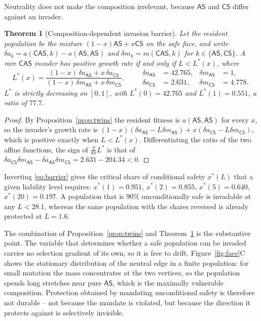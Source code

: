 \documentclass[pdflatex]{sn-jnl}
\theoremstyle{thmstyleone}
\newtheorem{theorem}{Theorem}
\theoremstyle{thmstylethree}
\theoremstyle{thmstyletwo}
\newcommand{\AS}{\textsf{AS}}
\newcommand{\CS}{\textsf{CS}}
\newcommand{\CAS}{\textsf{CAS}}
\begin{document}
Neutrality does not make the composition irrelevant, because $\AS$ and $\CS$
differ against an invader.

\begin{theorem}[Composition-dependent invasion barrier]\label{thm:barrier}
Let the resident population be the mixture $(1-x)\AS+x\CS$ on the safe face,
and write
$\delta a_{k}=a(\CAS,k)-a(\AS,\AS)$ and $\delta m_{k}=m(\CAS,k)$ for
$k\in\{\AS,\CS\}$. A rare $\CAS$ invader has positive growth rate if and only
if $L<L^{*}(x)$, where
\begin{equation}
L^{*}(x)=\frac{(1-x)\,\delta a_{\AS}+x\,\delta a_{\CS}}
               {(1-x)\,\delta m_{\AS}+x\,\delta m_{\CS}},
\qquad
\begin{aligned}
\delta a_{\AS}&=42.765, &\delta m_{\AS}&=1,\\
\delta a_{\CS}&=2.631, &\delta m_{\CS}&=4.778 .
\end{aligned}
\label{eq:barrier}
\end{equation}
$L^{*}$ is strictly decreasing on $[0,1]$, with $L^{*}(0)=42.765$ and
$L^{*}(1)=0.551$, a ratio of $77.7$.
\end{theorem}

\begin{proof}
By Proposition~\ref{prop:twins} the resident fitness is $a(\AS,\AS)$ for every
$x$, so the invader's growth rate is
$(1-x)(\delta a_{\AS}-L\delta m_{\AS})+x(\delta a_{\CS}-L\delta m_{\CS})$,
which is positive exactly when $L<L^{*}(x)$. Differentiating the ratio of the
two affine functions, the sign of $\frac{d}{dx}L^{*}$ is that of
$\delta a_{\CS}\delta m_{\AS}-\delta a_{\AS}\delta m_{\CS}=2.631-204.34<0$.
\end{proof}

Inverting \eqref{eq:barrier} gives the critical share of conditional safety
$x^{*}(L)$ that a given liability level requires: $x^{*}(1)=0.951$,
$x^{*}(2)=0.855$, $x^{*}(5)=0.640$, $x^{*}(20)=0.197$. A population that is
$90\%$ unconditionally safe is invadable at any $L<28.1$, whereas the same
population with the shares reversed is already protected at $L=1.6$.

The combination of Proposition~\ref{prop:twins} and
Theorem~\ref{thm:barrier} is the substantive point. The variable that
determines whether a safe population can be invaded carries no selection
gradient of its own, so it is free to drift. Figure~\ref{fig:face}C shows the
stationary distribution of the neutral edge in a finite population: for small
mutation the mass concentrates at the two vertices, so the population spends
long stretches near pure $\AS$, which is the maximally vulnerable composition.
Protection obtained by mandating unconditional safety is therefore not
durable -- not because the mandate is violated, but because the direction it
protects against is selectively invisible.
\end{document}
